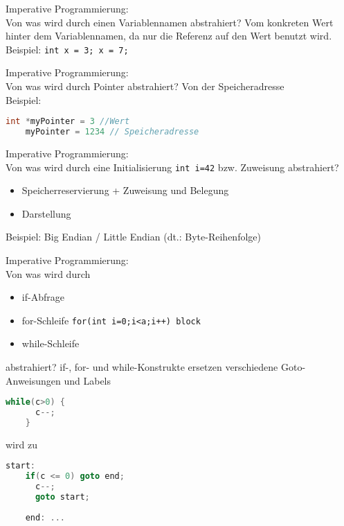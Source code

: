\begin{card}
	Imperative Programmierung:\\
	Von was wird durch einen Variablennamen abstrahiert?
	\hr
	Vom konkreten Wert hinter dem Variablennamen, da nur die Referenz auf den Wert benutzt wird.\\
		Beispiel: \texttt{int x = 3; x = 7;}
\end{card}

\begin{card}
	Imperative Programmierung:\\
	Von was wird durch Pointer abstrahiert?
	\hr
	Von der Speicheradresse\\
	Beispiel:
	\begin{lstlisting}[language=C]
	int *myPointer = 3 //Wert
	myPointer = 1234 // Speicheradresse
	\end{lstlisting}
\end{card}

\begin{card}
	Imperative Programmierung:\\
	Von was wird durch eine Initialisierung \texttt{int i=42} bzw. Zuweisung abstrahiert?
	\hr
	\begin{itemize}
	\item Speicherreservierung + Zuweisung und Belegung
	\item Darstellung
	\end{itemize}
	Beispiel: Big Endian / Little Endian (dt.: Byte-Reihenfolge)
\end{card}

\begin{card}
	Imperative Programmierung:\\
	Von was wird durch 
	\begin{itemize}
	\item if-Abfrage
	\item for-Schleife \texttt{for(int i=0;i<a;i++) block} 
	\item while-Schleife
	\end{itemize}
	abstrahiert?
	\hr
	if-, for- und while-Konstrukte ersetzen verschiedene Goto-Anweisungen und Labels 
	\begin{lstlisting}[language=C]
	while(c>0) {
	  c--;
	}
	\end{lstlisting}
	wird zu 
	\begin{lstlisting}[language=C]
	start:
	if(c <= 0) goto end;
	  c--;
	  goto start;
	
	end: ...
	\end{lstlisting}
\end{card}

